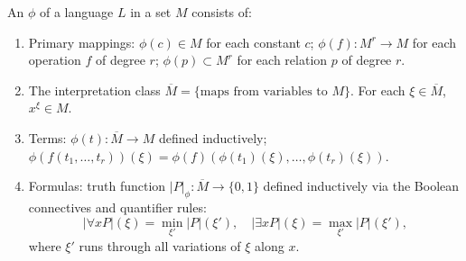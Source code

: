 An  $\phi$ of a language $L$ in a set $M$ consists of:
\begin{enumerate}
\item Primary mappings: $\phi(c) \in M$ for each constant $c$; $\phi(f): M^r \to M$ for each operation $f$ of degree $r$; $\phi(p) \subset M^r$ for each relation $p$ of degree $r$.
\item The interpretation class $\overline{M} = \{\text{maps from variables to } M\}$. For each $\xi \in \overline{M}$, $x^\xi \in M$.
\item Terms: $\phi(t): \overline{M} \to M$ defined inductively; $\phi(f(t_1,\ldots,t_r))(\xi) = \phi(f)(\phi(t_1)(\xi),\ldots,\phi(t_r)(\xi))$.
\item Formulas: truth function $|P|_\phi: \overline{M} \to \{0,1\}$ defined inductively via the Boolean connectives and quantifier rules:
$$|\forall x P|(\xi) = \min_{\xi'} |P|(\xi'), \quad |\exists x P|(\xi) = \max_{\xi'} |P|(\xi'),$$
where $\xi'$ runs through all variations of $\xi$ along $x$.
\end{enumerate}
